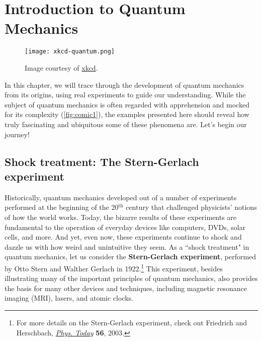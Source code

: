 

%

\chapter[Introduction]{Introduction to Quantum Mechanics} \label{ch:intro}
	
\begin{figure}[!h]
	\centering
	\texttt{[image: xkcd-quantum.png]} \label{fig:xkcd1} 
	\caption{Image courtesy of \href{https://xkcd.com/1240/}{xkcd}.}
	\label{fig:comic1}
\end{figure}

In this chapter, we will trace through the development of quantum mechanics from its origins, using real experiments to guide our understanding. 
While the subject of quantum mechanics is often regarded with apprehension and mocked for its complexity (\autoref{fig:comic1}), the examples presented here should reveal how truly fascinating and ubiquitous some of these phenomena are. 
Let's begin our journey!


\section[Shock treatment]{Shock treatment: The Stern-Gerlach experiment}

Historically, quantum mechanics developed out of a number of experiments performed at the beginning of the 20$^{\text{th}}$ century that challenged physicists' notions of how the world works. 
Today, the bizarre results of these experiments are fundamental to the operation of everyday devices like computers, DVDs, solar cells, and more. 
And yet, even now, these experiments continue to shock and dazzle us with how weird and unintuitive they seem. 
As a ``shock treatment" in quantum mechanics, let us consider the \textbf{Stern-Gerlach experiment}, performed by Otto Stern and Walther Gerlach in 1922.\footnote{For more details on the Stern-Gerlach experiment, check out Friedrich and Herschbach, \href{http://physicstoday.scitation.org/doi/10.1063/1.1650229}{\emph{Phys. Today}} \textbf{56}, 2003.}
This experiment, besides illustrating many of the important principles of quantum mechanics, also provides the basis for many other devices and techniques, including magnetic resonance imaging (MRI), lasers, and atomic clocks.

